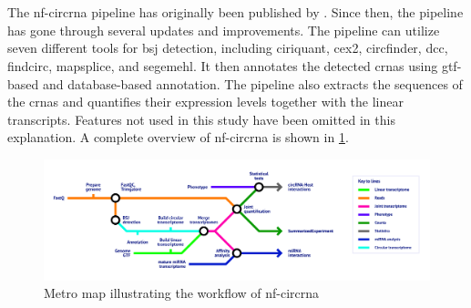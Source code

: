 \section{}
\label{sec:nf-core_circrna}
The \gls{nf-circrna} pipeline has originally been published by
\textcite{digby_nf-corecircrna_2023}.
Since then, the pipeline has gone through several updates and improvements.
The pipeline can utilize seven different tools for \gls{bsj} detection,
including \gls{ciriquant}, \gls{cex2}, \gls{circfinder}, \gls{dcc},
\gls{findcirc}, \gls{mapsplice}, and \gls{segemehl}.
It then annotates the detected \glspl{crna} using \gls{gtf}-based and
database-based annotation.
The pipeline also extracts the sequences of the \glspl{crna} and quantifies
their expression levels together with the linear transcripts.
Features not used in this study have been omitted in this explanation.
A complete overview of \gls{nf-circrna} is shown in
\cref{fig:circrna_pipeline}.

\begin{figure}[ht]
    \centering

    \includegraphics[width=\textwidth]{chapters/3_materials_and_methods/figures/nf-core_circrna.png}
    \caption{Metro map illustrating the workflow of \gls{nf-circrna}}
    \label{fig:circrna_pipeline}
\end{figure}




%
